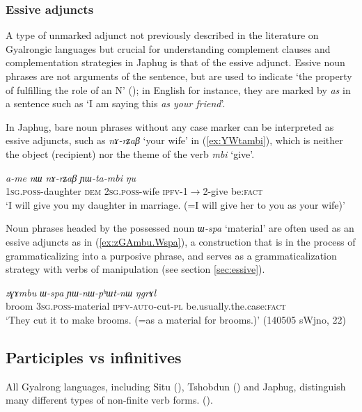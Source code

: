 \documentclass[oneside,a4paper,11pt]{article}
\newcommand{\ipa}[1]{\textit{\phon#1}}
\newcommand{\jpg}[2]{\ipa{#1} `#2'}
\begin{document}
\subsubsection{Essive adjuncts}
A type of unmarked adjunct not previously described in the literature on Gyalrongic languages but crucial for understanding complement clauses and complementation strategies in Japhug is that of the essive adjunct. Essive noun phrases are not arguments of the sentence, but are used to indicate `the property of fulfilling the role of an N' (\citealt[606]{creissels14functive}); in English for instance, they are marked by \textit{as} in a sentence such as `I am saying this \textit{as your friend}'.

In Japhug, bare noun phrases without any case marker can be interpreted as essive adjuncts, such as \ipa{nɤ-rʑaβ} `your wife' in (\ref{ex:YWtambi}), which is neither the object (recipient) nor the theme of the verb \jpg{mbi}{give}.

\begin{exe}
\ex \label{ex:YWtambi}
\gll \ipa{a-me} 	\ipa{nɯ} 	\ipa{nɤ-rʑaβ} 	\ipa{ɲɯ-ta-mbi} 	\ipa{ŋu} \\
\textsc{1sg.poss}-daughter \textsc{dem} \textsc{2sg.poss}-wife \textsc{ipfv}-1$\rightarrow$2-give be:\textsc{fact} \\
\glt `I will give you my daughter in marriage. (=I will give her to you as your wife)'
\end{exe}

Noun phrases headed by the possessed noun \jpg{ɯ-spa}{material} are often used as an essive adjuncts as in (\ref{ex:zGAmbu.Wspa}), a construction that is in the process of grammaticalizing into a purposive phrase, and serves as a grammaticalization strategy with verbs of manipulation (see section \ref{sec:essive}).

\begin{exe}
\ex \label{ex:zGAmbu.Wspa}
\gll \ipa{zɣɤmbu} 	\ipa{ɯ-spa} 	\ipa{ɲɯ-nɯ-pʰɯt-nɯ} 	\ipa{ŋgrɤl} \\
broom \textsc{3sg.poss}-material \textsc{ipfv-auto}-cut-\textsc{pl} be.usually.the.case:\textsc{fact} \\
\glt `They cut it to make brooms. (=as a material for brooms.)' (140505 sWjno, 22)
\end{exe}

\subsection{Participles vs infinitives} \label{sec:part.inf}
All Gyalrong languages, including Situ (\citealt{youjing03zhuokeji}), Tshobdun (\citealt{sun12complementation}) and Japhug, distinguish many different types of non-finite verb forms. (\citealt{jacksonlin07, genetti08nmlz, prins11kyomkyo}). 
\end{document}
